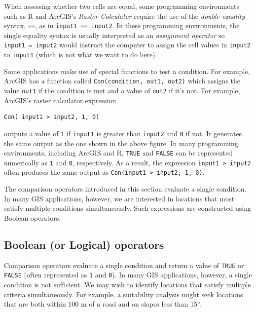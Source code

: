\documentclass[
  letterpaper,
]{book}
\begin{document}
When assessing whether two cells are equal, some programming
environments such as R and ArcGIS's \emph{Raster Calculator} require the
use of the \emph{double equality} syntax, \texttt{==}, as in
\texttt{input1\ ==\ input2}. In these programming environments, the
single equality syntax is usually interpreted as an \emph{assignment
operator} so \texttt{input1\ =\ input2} would instruct the computer to
assign the cell values in \texttt{input2} to \texttt{input1} (which is
not what we want to do here).

Some applications make use of special functions to test a condition. For
example, ArcGIS has a function called
\texttt{Con(condition,\ out1,\ out2)} which assigns the value
\texttt{out1} if the condition is met and a value of \texttt{out2} if
it's not. For example, ArcGIS's raster calculator expression

\begin{verbatim}
Con( input1 > input2, 1, 0)
\end{verbatim}

outputs a value of \texttt{1} if \texttt{input1} is greater than
\texttt{input2} and \texttt{0} if not. It generates the same output as
the one shown in the above figure. In many programming environments,
including ArcGIS and R, \texttt{TRUE} and \texttt{FALSE} can be
represented numerically as \texttt{1} and \texttt{0}, respectively. As a
result, the expression \texttt{input1\ \textgreater{}\ input2} often
produces the same output as
\texttt{Con(input1\ \textgreater{}\ input2,\ 1,\ 0)}.

The comparison operators introduced in this section evaluate a single
condition. In many GIS applications, however, we are interested in
locations that must satisfy multiple conditions simultaneously. Such
expressions are constructed using Boolean operators.

\subsection{Boolean (or Logical)
operators}\label{boolean-or-logical-operators}

Comparison operators evaluate a single condition and return a value of
\texttt{TRUE} or \texttt{FALSE} (often represented as \texttt{1} and
\texttt{0}). In many GIS applications, however, a single condition is
not sufficient. We may wish to identify locations that satisfy multiple
criteria simultaneously. For example, a suitability analysis might seek
locations that are both within 100 m of a road and on slopes less than
15°.
\end{document}
